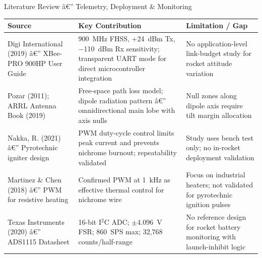 \documentclass[aspectratio=169, 11pt]{beamer}
\begin{document}
\begin{frame}[shrink=5]{Literature Review â€” Telemetry, Deployment \& Monitoring}
\small
\begin{tabular}{@{}p{2.8cm}p{4.6cm}p{4.0cm}@{}}
  \toprule
  \textbf{Source} & \textbf{Key Contribution} & \textbf{Limitation / Gap}\\
  \midrule
  Digi International (2019) â€” XBee-PRO 900HP User Guide &
    900~MHz FHSS, +24~dBm Tx, $-$110~dBm Rx sensitivity; transparent UART mode for direct microcontroller integration &
    No application-level link-budget study for rocket attitude variation \\[4pt]

  Pozar (2011); ARRL Antenna Book (2019) &
    Free-space path loss model; dipole radiation pattern â€” omnidirectional main lobe with axis nulls &
    Null zones along dipole axis require tilt margin allocation \\[4pt]

  Nakka, R. (2021) â€” Pyrotechnic igniter design &
    PWM duty-cycle control limits peak current and prevents nichrome burnout; repeatability validated &
    Study uses bench test only; no in-rocket deployment validation \\[4pt]

  Martinez \& Chen (2018) â€” PWM for resistive heating &
    Confirmed PWM at 1~kHz as effective thermal control for nichrome wire &
    Focus on industrial heaters; not validated for pyrotechnic ignition pulses \\[4pt]

  Texas Instruments (2020) â€” ADS1115 Datasheet &
    16-bit I$^2$C ADC; $\pm$4.096~V FSR; 860~SPS max; 32{,}768 counts/half-range &
    No reference design for rocket battery monitoring with launch-inhibit logic \\
  \bottomrule
\end{tabular}
\end{frame}
\end{document}
